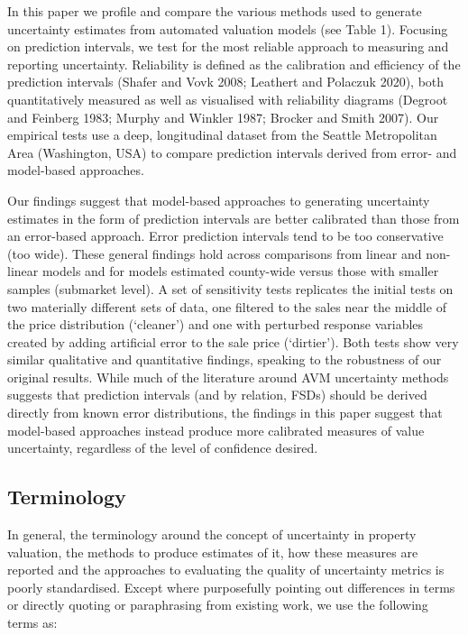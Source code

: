 \documentclass[colTwo]{format}
\theoremstyle{definition}
\begin{document}
In this paper we profile and compare the various methods used to generate uncertainty estimates from automated valuation models (see Table 1). Focusing on prediction intervals, we test for the most reliable approach to measuring and reporting uncertainty.  Reliability is defined as the calibration and efficiency of the prediction intervals (Shafer and Vovk 2008; Leathert and Polaczuk 2020), both quantitatively measured as well as visualised with reliability diagrams (Degroot and Feinberg 1983; Murphy and Winkler 1987; Brocker and Smith 2007).  Our empirical tests use a deep, longitudinal dataset from the Seattle Metropolitan Area (Washington, USA) to compare prediction intervals derived from error- and model-based approaches. 

Our findings suggest that model-based approaches to generating uncertainty estimates in the form of prediction intervals are better calibrated than those from an error-based approach. Error prediction intervals tend to be too conservative (too wide).  These general findings hold across comparisons from linear and non-linear models and for models estimated county-wide versus those with smaller samples (submarket level).   A set of sensitivity tests replicates the initial tests on two materially different sets of data, one filtered to the sales near the middle of the price distribution (‘cleaner’) and one with perturbed response variables created by adding artificial error to the sale price (‘dirtier’).  Both tests show very similar qualitative and quantitative findings, speaking to the robustness of our original results.  While much of the literature around AVM uncertainty methods suggests that prediction intervals (and by relation, FSDs) should be derived directly from known error distributions, the findings in this paper suggest that model-based approaches instead produce more calibrated measures of value uncertainty, regardless of the level of confidence desired.  

\subsection{Terminology}

In general, the terminology around the concept of uncertainty in property valuation, the methods to produce estimates of it, how these measures are reported and the approaches to evaluating the quality of uncertainty metrics is poorly standardised.  Except where purposefully pointing out differences in terms or directly quoting or paraphrasing from existing work, we use the following terms as:
\end{document}
